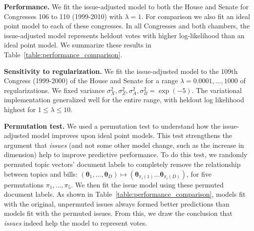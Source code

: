 \textbf{Performance.}
We fit the issue-adjusted model to both the House and Senate for
Congresses 106 to 110 (1999-2010) with $\lambda=1$. For comparison we
also fit an ideal point model to each of these congresses. In all
Congresses and both chambers, the issue-adjusted model represents
heldout votes with higher log-likelihood than an ideal point model. We
summarize these results in Table~\ref{table:performance_comparison}.

\textbf{Sensitivity to regularization.}  We fit the
issue-adjusted model to the 109th Congress (1999-2000) of the House
and Senate for a range $\lambda=0.0001, \ldots, 1000$ of
regularizations.  We fixed variance $\sigma_X^2, \sigma_Z^2,
\sigma_A^2, \sigma_B^2=\exp({-}5)$. The variational implementation
generalized well for the entire range, with heldout log likelihood
highest for $1 \le \lambda \le 10$.

\textbf{Permutation test.} We used a permutation test to understand
how the issue-adjusted model improves upon ideal point models.  This
test strengthens the argument that \emph{issues} (and not some other
model change, such as the increase in dimension) help to
improve predictive performance. To do this test, we randomly
permuted topic vectors' document labels to completely remove the
relationship between topics and bills: $(\bm \theta_1,
\ldots, \bm \theta_D) \mapsto (\bm
  \theta_{\pi_i(1)} \ldots \bm \theta_{\pi_i(D)})$, for
five permutations $\pi_1, \ldots, \pi_{5}$.  We then fit the issue
model using these permuted document labels.  As shown in
Table~\ref{table:performance_comparison}, models fit with the
original, unpermuted issues always formed better predictions than
models fit with the permuted issues. From this, we draw the conclusion
that \emph{issues} indeed help the model to represent votes.




